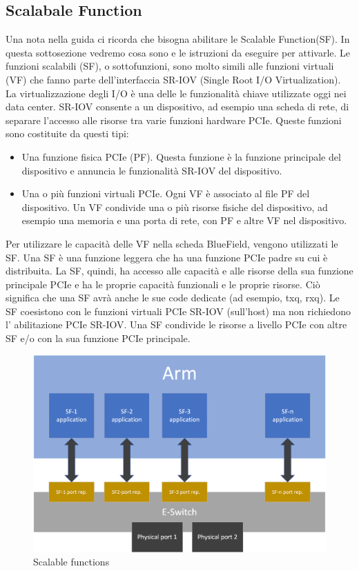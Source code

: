 \documentclass[binding=0.6cm]{sapthesis}
\theoremstyle{definition}
\begin{document}
\subsection{Scalabale Function}
Una nota nella guida ci ricorda che bisogna abilitare le Scalable Function(SF). 
In questa sottosezione vedremo cosa sono e le istruzioni da eseguire per attivarle.
\cite{doca doc scalable function }
Le funzioni scalabili (SF), o sottofunzioni, sono molto simili alle funzioni virtuali (VF) che fanno
parte dell'interfaccia SR-IOV (Single Root I/O Virtualization).
La virtualizzazione degli I/O è una delle le funzionalità chiave utilizzate oggi nei data center.
SR-IOV consente a un dispositivo, ad esempio una scheda di rete, di separare l'accesso alle risorse
 tra varie funzioni hardware PCIe. Queste funzioni sono costituite da questi tipi:
\begin{itemize}
    \item Una funzione fisica PCIe (PF). Questa funzione è la funzione principale del dispositivo e 
    annuncia le funzionalità SR-IOV del dispositivo. 
    \item Una o più funzioni virtuali PCIe. Ogni VF è associato al file PF del dispositivo. 
    Un VF condivide una o più risorse fisiche del dispositivo, ad esempio una memoria e una porta 
    di rete, con PF e altre VF nel dispositivo. 

\end{itemize}    
Per utilizzare le capacità delle VF nella scheda BlueField, vengono utilizzati le SF.
Una SF è una funzione leggera che ha una funzione PCIe padre su cui è distribuita. 
La SF, quindi, ha accesso alle capacità e alle risorse della sua funzione principale PCIe 
e ha le proprie capacità funzionali e le proprie risorse. Ciò significa che una SF avrà anche le sue code dedicate
(ad esempio, txq, rxq).
Le SF coesistono con le funzioni virtuali PCIe SR-IOV (sull'host) ma non richiedono l'
abilitazione PCIe SR-IOV. 
Una SF condivide le risorse a livello PCIe con altre SF e/o con la sua funzione PCIe principale.  
\begin{figure}[H]
    \centering
    \includegraphics[scale=0.3]{scalable-functions-illustration.png}
    \caption{Scalable functions}
    \label{fig:sf}
\end{figure}
\end{document}
